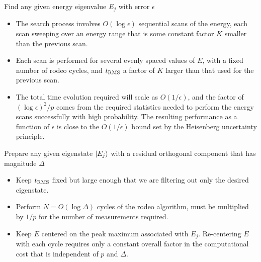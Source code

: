 \documentclass{beamer}
\begin{document}
\begin{frame}{Find any given energy eigenvalue $E_j$ with error $\epsilon$}
\begin{itemize}
\item The search process involves $O(\log \epsilon)$ sequential scans of the energy, each scan sweeping over an energy range that is some constant factor $K$ smaller than the previous scan.

\item Each scan is performed for several evenly spaced values of $E$, with a fixed number of rodeo cycles, and $t_{\rm RMS}$ a factor of $K$ larger than that used for the previous scan. 

\item The total time evolution required will scale as $O(1/\epsilon)$,  and the factor of $(\log \epsilon)^2/p$ comes from the required statistics needed to perform the energy scans successfully with high probability. The resulting performance as a function of $\epsilon$ is close to the $O(1/\epsilon)$ bound set by the Heisenberg uncertainty principle. 
\end{itemize}

\end{frame}



\begin{frame}{Prepare any given eigenstate $\ket{E_j}$ with a residual orthogonal component that has magnitude $\Delta$}
\begin{itemize}
\item Keep $t_{\rm RMS}$ fixed but large enough that we are filtering out only the desired eigenstate.

\item Perform $N = O(\log \Delta)$ cycles of the rodeo algorithm, must be multiplied by $1/p$ for the number of measurements required.

\item Keep $E$ centered on the peak maximum associated with $E_j$.  Re-centering $E$ with each cycle requires only a constant overall factor in the computational cost that is independent of $p$ and $\Delta$.
\end{itemize}

\end{frame}
\end{document}
